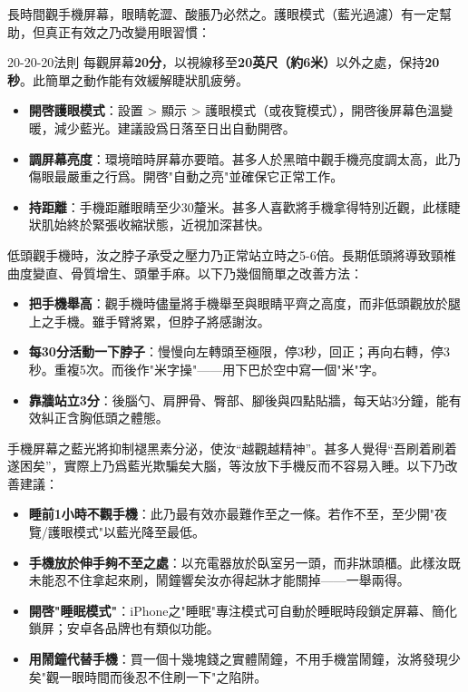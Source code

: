 
長時間觀手機屏幕，眼睛乾澀、酸脹乃必然之。護眼模式（藍光過濾）有一定幫助，但真正有效之乃改變用眼習慣：

\begin{tcbinfo}{20-20-20法則}
每觀屏幕\textbf{20分}，以視線移至\textbf{20英尺（約6米）}以外之處，保持\textbf{20秒}。此簡單之動作能有效緩解睫狀肌疲勞。

\end{tcbinfo}

\begin{itemize}
  \item \textbf{開啓護眼模式}：設置 > 顯示 > 護眼模式（或夜覽模式），開啓後屏幕色溫變暖，減少藍光。建議設爲日落至日出自動開啓。
  \item \textbf{調屏幕亮度}：環境暗時屏幕亦要暗。甚多人於黑暗中觀手機亮度調太高，此乃傷眼最嚴重之行爲。開啓"自動之亮"並確保它正常工作。
  \item \textbf{持距離}：手機距離眼睛至少30釐米。甚多人喜歡將手機拿得特別近觀，此樣睫狀肌始終於緊張收縮狀態，近視加深甚快。
\end{itemize}


低頭觀手機時，汝之脖子承受之壓力乃正常站立時之5-6倍。長期低頭將導致頸椎曲度變直、骨質增生、頭暈手麻。以下乃幾個簡單之改善方法：

\begin{itemize}
  \item \textbf{把手機舉高}：觀手機時儘量將手機舉至與眼睛平齊之高度，而非低頭觀放於腿上之手機。雖手臂將累，但脖子將感謝汝。
  \item \textbf{每30分活動一下脖子}：慢慢向左轉頭至極限，停3秒，回正；再向右轉，停3秒。重複5次。而後作"米字操"——用下巴於空中寫一個"米"字。
  \item \textbf{靠牆站立3分}：後腦勺、肩胛骨、臀部、腳後與四點貼牆，每天站3分鐘，能有效糾正含胸低頭之體態。
\end{itemize}


手機屏幕之藍光將抑制褪黑素分泌，使汝“越觀越精神”。甚多人覺得“吾刷着刷着遂困矣”，實際上乃爲藍光欺騙矣大腦，等汝放下手機反而不容易入睡。以下乃改善建議：

\begin{itemize}
  \item \textbf{睡前1小時不觀手機}：此乃最有效亦最難作至之一條。若作不至，至少開"夜覽/護眼模式"以藍光降至最低。
  \item \textbf{手機放於伸手夠不至之處}：以充電器放於臥室另一頭，而非牀頭櫃。此樣汝既未能忍不住拿起來刷，鬧鐘響矣汝亦得起牀才能關掉——一舉兩得。
  \item \textbf{開啓"睡眠模式"}：iPhone之"睡眠"專注模式可自動於睡眠時段鎖定屏幕、簡化鎖屏；安卓各品牌也有類似功能。
  \item \textbf{用鬧鐘代替手機}：買一個十幾塊錢之實體鬧鐘，不用手機當鬧鐘，汝將發現少矣"觀一眼時間而後忍不住刷一下"之陷阱。
\end{itemize}

